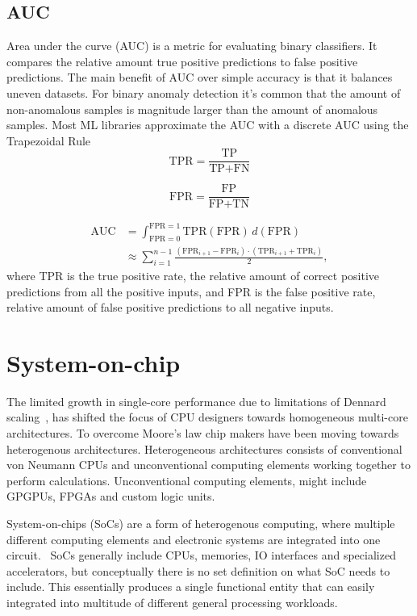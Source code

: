 \documentclass[12pt,a4paper,english
]{tunithesis}
\begin{document}
\subsection{AUC}
Area under the curve (AUC) is a metric for evaluating binary classifiers. It compares the relative amount true positive predictions to false positive predictions.
The main benefit of AUC over simple accuracy is that it balances uneven datasets. For binary anomaly detection it's common that the amount of non-anomalous samples is magnitude larger than the amount of anomalous samples.
Most ML libraries approximate the AUC with a discrete AUC using the Trapezoidal Rule~\cite{paszke_pytorch_2019}
\begin{equation}
\text{TPR} =  \frac{\text{TP}}{\text{TP} + \text{FN}}
\end{equation}

\begin{equation}
\text{FPR} = \frac{\text{FP}}{\text{FP} + \text{TN}}
\end{equation}

\begin{align}
  \text{AUC} & = \int_{\text{FPR}=0}^{\text{FPR}=1} \text{TPR}(\text{FPR}) \, d(\text{FPR}) \\
  & \approx \sum_{i=1}^{n-1} \frac{(\text{FPR}_{i+1} - \text{FPR}_i) \cdot (\text{TPR}_{i+1} + \text{TPR}_i)}{2},
\end{align}
where TPR is the true positive rate, the relative amount of correct positive predictions from all the positive inputs, and FPR is the false positive rate, relative amount of false positive predictions to all negative inputs.

\section{System-on-chip}
The limited growth in single-core performance due to limitations of Dennard scaling~\cite{esmaeilzadeh_dark_2011}, has shifted the focus of CPU designers towards homogeneous multi-core architectures.
To overcome Moore's law chip makers have been moving towards heterogenous architectures. Heterogeneous architectures consists of conventional von Neumann CPUs and unconventional computing elements working together to perform calculations. Unconventional computing elements, might include GPGPUs, FPGAs and custom logic units.~\cite{chung_single-chip_2010}

System-on-chips (SoCs) are a form of heterogenous computing, where multiple different computing elements and electronic systems are integrated into one circuit.~\cite{Greaves2021}
SoCs generally include CPUs, memories, IO interfaces and specialized accelerators, but conceptually there is no set definition on what SoC needs to include.
This essentially produces a single functional entity that can easily integrated into multitude of different general processing workloads.
\end{document}
